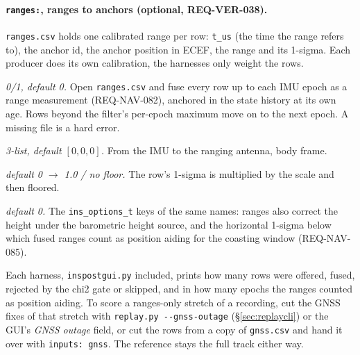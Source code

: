 \documentclass[11pt,a4paper]{article}
\newcommand{\code}[1]{\texttt{#1}}
\begin{document}
\paragraph{\code{ranges:}, ranges to anchors (optional, REQ-VER-038).}
\code{ranges.csv} holds one calibrated range per row: \code{t\_us} (the time
the range refers to), the anchor id, the anchor position in ECEF, the range
and its 1-sigma. Each producer does its own calibration, the harnesses only
weight the rows.
\begin{description}\setlength\itemsep{0pt}
  \item[\code{ranges: enable}] \emph{0/1, default 0.} Open
    \code{ranges.csv} and fuse every row up to each IMU epoch as a range
    measurement (REQ-NAV-082), anchored in the state history at its own
    age. Rows beyond the filter's per-epoch maximum move on to the next
    epoch. A missing file is a hard error.
  \item[\code{ranges: leverarm\_\allowbreak{}frd}] \emph{3-list, default
    $[0,0,0]$.} From the IMU to the ranging antenna, body frame.
  \item[\code{ranges: stddev\_\allowbreak{}scale},
    \code{ranges: stddev\_\allowbreak{}min\_\allowbreak{}m}]
    \emph{default 0 $\to$ 1.0 / no floor.} The row's 1-sigma is multiplied
    by the scale and then floored.
  \item[\code{ranges: height\_\allowbreak{}with\_\allowbreak{}baro},
    \code{ranges: aiding\_\allowbreak{}max\_\allowbreak{}hpos\_\allowbreak{}stddev\_\allowbreak{}m}]
    \emph{default 0.} The \code{ins\_options\_t} keys of the same names:
    ranges also correct the height under the barometric height source, and
    the horizontal 1-sigma below which fused ranges count as position
    aiding for the coasting window (REQ-NAV-085).
\end{description}
Each harness, \code{inspostgui.py} included, prints how many rows were
offered, fused, rejected by the chi2 gate or skipped, and in how many epochs
the ranges counted as position aiding. To score a ranges-only stretch of a
recording, cut the GNSS fixes of that stretch with \code{replay.py
-{}-gnss-outage} (\S\ref{sec:replaycli}) or the GUI's \emph{GNSS outage}
field, or cut the rows from a copy of \code{gnss.csv} and hand it over with
\code{inputs: gnss}. The reference stays the full track either way.
\end{document}
